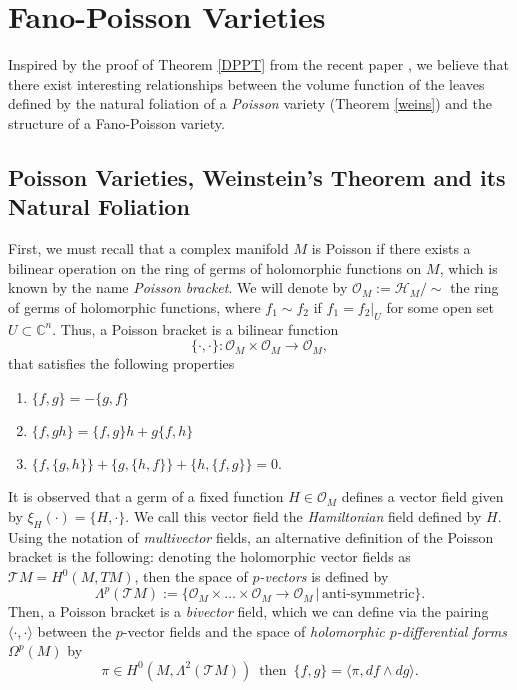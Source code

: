 \documentclass[12pt,twoside,a4paper]{report}
\newcommand{\con}{\ensuremath{\mathbb{C}^n}}
\begin{document}
\section{Fano-Poisson Varieties}
\noindent Inspired by the proof of Theorem \ref{DPPT} from the recent paper \cite{DPPT}, we believe that there exist
interesting relationships between the volume function of the leaves defined by the natural foliation of a \emph{Poisson} variety
(Theorem \ref{weins}) and the structure of a Fano-Poisson variety.

\subsection{Poisson Varieties, Weinstein's Theorem and its Natural Foliation}
\noindent First, we must recall that a complex manifold $M$ is Poisson if there exists a bilinear operation on the ring of germs of
holomorphic functions on $M$, which is known by the name \emph{Poisson bracket}.
We will denote by $\mathcal{O}_M:=\mathcal{H}_M/\sim$ the ring of germs of holomorphic functions, where $f_1\sim f_2$ if
$f_1=f_2|_U$ for some open set $U\subset\con$. Thus, a Poisson bracket is a bilinear function
\[
\{\cdot,\cdot\}:\mathcal{O}_M\times\mathcal{O}_M\rightarrow\mathcal{O}_M,
\]
that satisfies the following properties
\begin{enumerate}
\item $\{f,g\} = -\{g,f\}$
\item $\{f,gh\}=\{f,g\}h + g\{f,h\}$
\item $\{f,\{g,h\}\}+\{g,\{h,f\}\} + \{h,\{ f,g\}\}=0$.
\end{enumerate}
\noindent It is observed that a germ of a fixed function $H\in\mathcal{O}_M$ defines a vector field given by $\xi_H(\cdot)=\{H,\cdot\}$.
We call this vector field the \emph{Hamiltonian} field defined by $H$. Using the notation of \emph{multivector} fields,
an alternative definition of the Poisson bracket is the following: denoting the holomorphic vector fields as $\mathcal{T}M=H^0(M,TM)$,
then the space of \emph{$p$-vectors} is defined by
\[
        \Lambda^{p}(\mathcal{T}M):=\{\mathcal{O}_M\times\dots\times\mathcal{O}_M\rightarrow\mathcal{O}_M\,\vert\,\text{anti-symmetric}\}.
\]
Then, a Poisson bracket is a \emph{bivector} field, which we can define via the pairing $\langle\cdot,\cdot\rangle$
between the $p$-vector fields and the space of \emph{holomorphic $p$-differential forms} $\Omega^{p}(M)$ by
\[
        \pi\in H^0(M,\Lambda^2(\mathcal{T}M))\,\text{ then }\,\{f,g\}=\langle \pi,df\wedge dg\rangle.
\]
\end{document}
